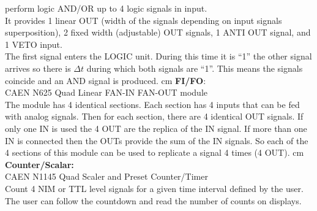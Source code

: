     perform logic AND/OR up to 4 logic signals in input.\\
	It provides 1 linear OUT (width of the signals depending on input signals superposition),
    2 ﬁxed width (adjustable) OUT signals, 1 ANTI OUT signal, and 1 VETO input.\\
	The ﬁrst signal enters the LOGIC unit. During this time it is “1” the other signal arrives
    so there is $\Delta t$ during which both signals are “1”. 
    This means the signals coincide and an AND signal is produced.
	 cm
	\textbf{FI/FO}:\\ CAEN N625 Quad Linear FAN-IN FAN-OUT module\\
	The module has 4 identical sections. Each section has 4 inputs that can be fed with analog
    signals. Then for each section, there are 4 identical OUT signals. If only one IN is used the
    4 OUT are the replica of the IN signal. If more than one IN is connected then the OUTs provide
    the sum of the IN signals. So each of the 4 sections of this module can be used to replicate 
    a signal 4 times (4 OUT).
	 cm
	\textbf{Counter/Scalar:}\\ CAEN N1145 Quad Scaler and Preset Counter/Timer\\
	Count 4 NIM or TTL level signals for a given time interval deﬁned by the user.
    The user can follow the countdown and read the number of counts on displays.

